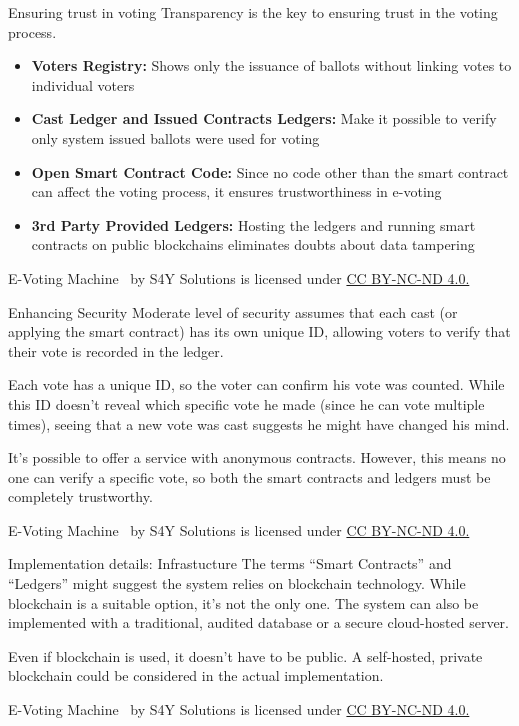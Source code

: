 \documentclass[12pt]{beamer}
\newcommand{\currentyear}{\the\year} %
\newcommand{\copyrightnote}{
    \vfill
    \begin{flushleft}
    \tiny
    E-Voting Machine \textcopyright \currentyear~by S4Y Solutions is licensed under \href{https://creativecommons.org/licenses/by-nc-nd/4.0}{CC BY-NC-ND 4.0.}
    \end{flushleft}
}
\begin{document}

    \begin{frame}[allowframebreaks]{Ensuring trust in voting}
        \vfill
        Transparency is the key to ensuring trust in the voting process.
        \begin{itemize}
            \item \textbf{Voters Registry:} Shows only the issuance of ballots without linking
            votes to individual voters
            \item \textbf{Cast Ledger and Issued Contracts Ledgers:} Make it possible to
            verify only system issued ballots were used for voting
            \item \textbf{Open Smart Contract Code:} Since no code other than the
            smart contract can affect the voting process, it ensures trustworthiness in e-voting
            \item \textbf{3rd Party Provided Ledgers:} Hosting the ledgers and running
            smart contracts on public blockchains eliminates doubts about data tampering
        \end{itemize}
        \copyrightnote
    \end{frame}


    \begin{frame}[allowframebreaks]{Enhancing Security}
        \vfill
        Moderate level of security assumes that each cast (or applying the smart contract) has
        its own unique ID, allowing voters to verify that their vote is recorded in the ledger.

        Each vote has a unique ID, so the voter can confirm his vote was counted. While
        this ID doesn’t reveal which specific vote he made (since he can vote multiple
        times), seeing that a new vote was cast suggests he might have changed
        his mind.

        It’s possible to offer a service with anonymous contracts. However, this means
        no one can verify a specific vote, so both the smart contracts and ledgers
        must be completely trustworthy.
        \copyrightnote
    \end{frame}

    \begin{frame}[allowframebreaks]{Implementation details: Infrastucture}
        \vfill
        The terms “Smart Contracts” and “Ledgers” might suggest the system relies on blockchain technology.
        While blockchain is a suitable option, it’s not the only one. The system can also be implemented with
        a traditional, audited database or a secure cloud-hosted server.

        Even if blockchain is used, it doesn’t have to be public. A self-hosted, private blockchain could be
        considered in the actual implementation.
        \copyrightnote
    \end{frame}
\end{document}
